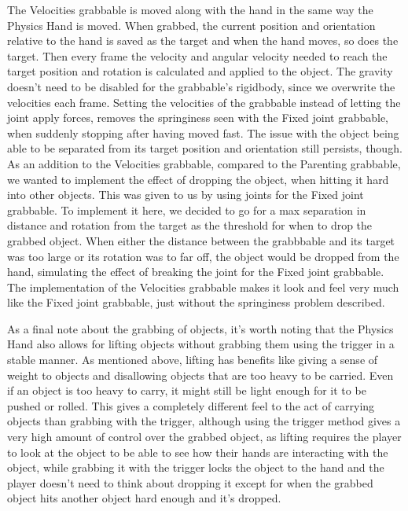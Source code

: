 The Velocities grabbable is moved along with the hand in the same way the Physics Hand is moved. When grabbed, the current position and orientation relative to the hand is saved as the target and when the hand moves, so does the target. Then every frame the velocity and angular velocity needed to reach the target position and rotation is calculated and applied to the object. The gravity doesn't need to be disabled for the grabbable's rigidbody, since we overwrite the velocities each frame. Setting the velocities of the grabbable instead of letting the joint apply forces, removes the springiness seen with the Fixed joint grabbable, when suddenly stopping after having moved fast. The issue with the object being able to be separated from its target position and orientation still persists, though. As an addition to the Velocities grabbable, compared to the Parenting grabbable, we wanted to implement the effect of dropping the object, when hitting it hard into other objects. This was given to us by using joints for the Fixed joint grabbable. To implement it here, we decided to go for a max separation in distance and rotation from the target as the threshold for when to drop the grabbed object. When either the distance between the grabbbable and its target was too large or its rotation was to far off, the object would be dropped from the hand, simulating the effect of breaking the joint for the Fixed joint grabbable. The implementation of the Velocities grabbable makes it look and feel very much like the Fixed joint grabbable, just without the springiness problem described.

As a final note about the grabbing of objects, it's worth noting that the Physics Hand also allows for lifting objects without grabbing them using the trigger in a stable manner. As mentioned above, lifting has benefits like giving a sense of weight to objects and disallowing objects that are too heavy to be carried. Even if an object is too heavy to carry, it might still be light enough for it to be pushed or rolled. This gives a completely different feel to the act of carrying objects than grabbing with the trigger, although using the trigger method gives a very high amount of control over the grabbed object, as lifting requires the player to look at the object to be able to see how their hands are interacting with the object, while grabbing it with the trigger locks the object to the hand and the player doesn't need to think about dropping it except for when the grabbed object hits another object hard enough and it's dropped.

